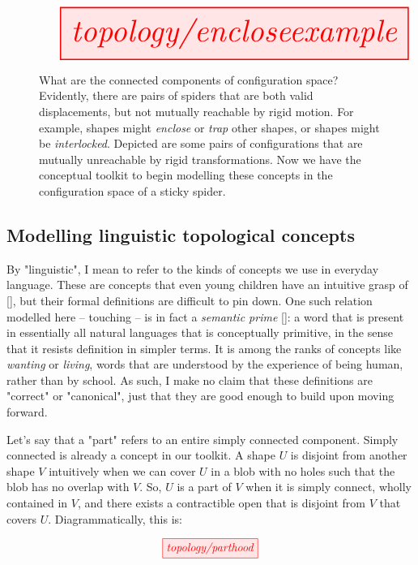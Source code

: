 \begin{figure}[h!]
\centering
\[\resizebox{\textwidth}{!}{\tikzfig{topology/encloseexample}}\]
\caption{What are the connected components of configuration space? Evidently, there are pairs of spiders that are both valid displacements, but not mutually reachable by rigid motion. For example, shapes might \emph{enclose} or \emph{trap} other shapes, or shapes might be \emph{interlocked}. Depicted are some pairs of configurations that are mutually unreachable by rigid transformations. Now we have the conceptual toolkit to begin modelling these concepts in the configuration space of a sticky spider.}
\end{figure}

\subsection{Modelling linguistic topological concepts}\label{sec:topconcept}

By "linguistic", I mean to refer to the kinds of concepts we use in everyday language. These are concepts that even young children have an intuitive grasp of [], but their formal definitions are difficult to pin down. One such relation modelled here -- touching -- is in fact a \emph{semantic prime} []: a word that is present in essentially all natural languages that is conceptually primitive, in the sense that it resists definition in simpler terms. It is among the ranks of concepts like \emph{wanting} or \emph{living}, words that are understood by the experience of being human, rather than by school. As such, I make no claim that these definitions are "correct" or "canonical", just that they are good enough to build upon moving forward.


Let's say that a "part" refers to an entire simply connected component. Simply connected is already a concept in our toolkit. A shape $U$ is disjoint from another shape $V$ intuitively when we can cover $U$ in a blob with no holes such that the blob has no overlap with $V$. So, $U$ is a part of $V$ when it is simply connect, wholly contained in $V$, and there exists a contractible open that is disjoint from $V$ that covers $U$. Diagrammatically, this is:

\[\tikzfig{topology/parthood}\]


